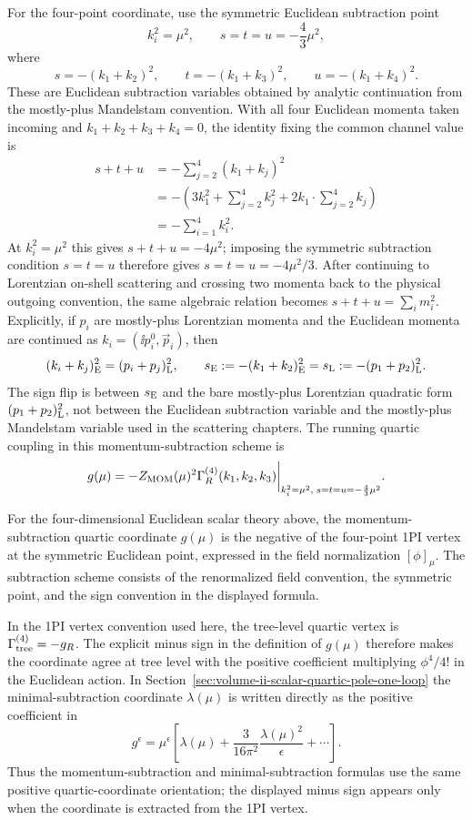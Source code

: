 For the four-point coordinate, use the symmetric Euclidean subtraction point
\[
  k_i^2=\mu^2,\qquad
  s=t=u=-\frac43\mu^2,
\]
where
\[
  s=-(k_1+k_2)^2,\qquad
  t=-(k_1+k_3)^2,\qquad
  u=-(k_1+k_4)^2 .
\]
These are Euclidean subtraction variables obtained by analytic continuation
from the mostly-plus Mandelstam convention.  With all four Euclidean momenta
taken incoming and \(k_1+k_2+k_3+k_4=0\), the identity fixing the common
channel value is
\[
\begin{aligned}
  s+t+u
  &=
  -\sum_{j=2}^4 (k_1+k_j)^2  \\
  &=
  -\left(
    3k_1^2+\sum_{j=2}^4 k_j^2
    +2k_1\cdot\sum_{j=2}^4 k_j
  \right) \\
  &=
  -\sum_{i=1}^4 k_i^2 .
\end{aligned}
\]
At \(k_i^2=\mu^2\) this gives \(s+t+u=-4\mu^2\); imposing the symmetric
subtraction condition \(s=t=u\) therefore gives \(s=t=u=-4\mu^2/3\).  After
continuing to Lorentzian on-shell scattering and crossing two momenta back to
the physical outgoing convention, the same algebraic relation becomes
\(s+t+u=\sum_i m_i^2\).
Explicitly, if \(p_i\) are mostly-plus Lorentzian momenta and the Euclidean
momenta are continued as \(k_i=(\ii p_i^0,\vec p_i)\), then
\[
  (k_i+k_j)^2_{\rm E}=(p_i+p_j)^2_{\rm L},
  \qquad
  s_{\rm E}:=-(k_1+k_2)^2_{\rm E}
  =
  s_{\rm L}:=-(p_1+p_2)^2_{\rm L}.
\]
The sign flip is between \(s_{\rm E}\) and the bare mostly-plus Lorentzian
quadratic form \((p_1+p_2)^2_{\rm L}\), not between the Euclidean subtraction
variable and the mostly-plus Mandelstam variable used in the scattering
chapters.
The running quartic coupling in this momentum-subtraction scheme is
\[
  g(\mu)
  =
  -Z_{\rm MOM}(\mu)^2
  \Gamma_R^{(4)}(k_1,k_2,k_3)
  \bigg|_{k_i^2=\mu^2,\;s=t=u=-\frac43\mu^2}.
\]

\begin{definition}
For the four-dimensional Euclidean scalar theory above, the momentum-
subtraction quartic coordinate \(g(\mu)\) is the negative of the four-point
1PI vertex at the symmetric Euclidean point, expressed in the field
normalization \([\phi]_\mu\).  The subtraction scheme consists of the
renormalized field convention, the symmetric point, and the sign convention in
the displayed formula.
\end{definition}
In the 1PI vertex convention used here, the tree-level quartic vertex is
\(\Gamma_{\rm tree}^{(4)}=-g_R\).  The explicit minus sign in the definition of
\(g(\mu)\) therefore makes the coordinate agree at tree level with the positive
coefficient multiplying \(\phi^4/4!\) in the Euclidean action.  In
Section~\ref{sec:volume-ii-scalar-quartic-pole-one-loop} the
minimal-subtraction coordinate \(\lambda(\mu)\) is written directly as the
positive coefficient in
\[
  g^\epsilon
  =
  \mu^\epsilon
  \left[
    \lambda(\mu)
    +\frac{3}{16\pi^2}\frac{\lambda(\mu)^2}{\epsilon}
    +\cdots
  \right].
\]
Thus the momentum-subtraction and minimal-subtraction formulas use the same
positive quartic-coordinate orientation; the displayed minus sign appears only
when the coordinate is extracted from the 1PI vertex.

